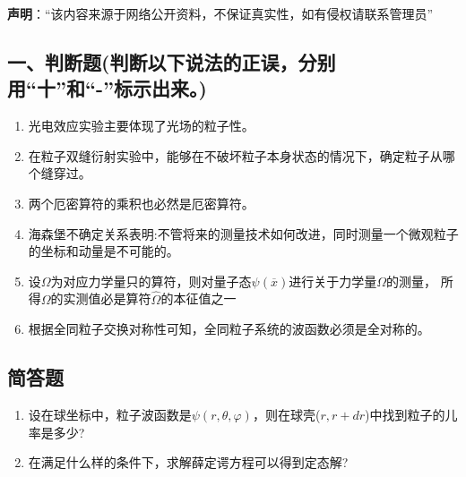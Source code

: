 
\textbf{声明}：“该内容来源于网络公开资料，不保证真实性，如有侵权请联系管理员”

\subsection{一、判断题(判断以下说法的正误，分别用“十”和“-”标示出来。)}
\begin{enumerate}
\item 光电效应实验主要体现了光场的粒子性。
\item 在粒子双缝衍射实验中，能够在不破坏粒子本身状态的情况下，确定粒子从哪个缝穿过。
\item 两个厄密算符的乘积也必然是厄密算符。
\item 海森堡不确定关系表明:不管将来的测量技术如何改进，同时测量一个微观粒子的坐标和动量是不可能的。
\item 设$\Omega$为对应力学量只的算符，则对量子态$\psi(\overline x)$进行关于力学量$\Omega$的测量，
所得$\Omega$的实测值必是算符$\hat\Omega$的本征值之一
\item 根据全同粒子交换对称性可知，全同粒子系统的波函数必须是全对称的。
\end{enumerate}
\subsection{简答题}
\begin{enumerate}
\item 设在球坐标中，粒子波函数是$\psi(r,\theta,\varphi)$，则在球壳($r,r+dr$)中找到粒子的儿
率是多少?
\item 在满足什么样的条件下，求解薛定谔方程可以得到定态解?
\end{enumerate}
